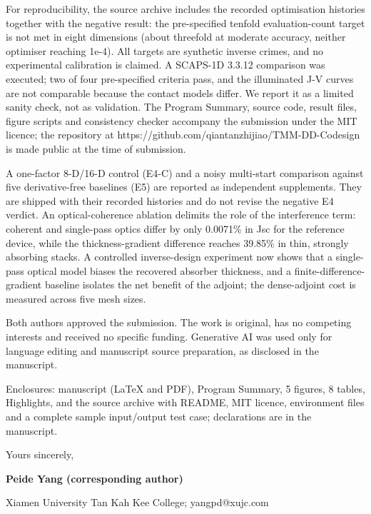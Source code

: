 \documentclass[10pt]{article}
\begin{document}
\vspace{2pt}
For reproducibility, the source archive includes the recorded optimisation histories together with the negative result: the pre-specified tenfold evaluation-count target is not met in eight dimensions (about threefold at moderate accuracy, neither optimiser reaching 1e-4). All targets are synthetic inverse crimes, and no experimental calibration is claimed. A SCAPS-1D 3.3.12 comparison was executed; two of four pre-specified criteria pass, and the illuminated J-V curves are not comparable because the contact models differ. We report it as a limited sanity check, not as validation. The Program Summary, source code, result files, figure scripts and consistency checker accompany the submission under the MIT licence; the repository at https://github.com/qiantanzhijiao/TMM-DD-Codesign is made public at the time of submission.\par
\vspace{2pt}
A one-factor 8-D/16-D control (E4-C) and a noisy multi-start comparison against five derivative-free baselines (E5) are reported as independent supplements. They are shipped with their recorded histories and do not revise the negative E4 verdict. An optical-coherence ablation delimits the role of the interference term: coherent and single-pass optics differ by only 0.0071\% in Jsc for the reference device, while the thickness-gradient difference reaches 39.85\% in thin, strongly absorbing stacks. A controlled inverse-design experiment now shows that a single-pass optical model biases the recovered absorber thickness, and a finite-difference-gradient baseline isolates the net benefit of the adjoint; the dense-adjoint cost is measured across five mesh sizes.\par
\vspace{2pt}
Both authors approved the submission. The work is original, has no competing interests and received no specific funding. Generative AI was used only for language editing and manuscript source preparation, as disclosed in the manuscript.\par
\vspace{2pt}
Enclosures: manuscript (LaTeX and PDF), Program Summary, 5 figures, 8 tables, Highlights, and the source archive with README, MIT licence, environment files and a complete sample input/output test case; declarations are in the manuscript.\par
\vspace{2pt}
Yours sincerely,\par
\vspace{2pt}
\textbf{Peide Yang (corresponding author)}\par
Xiamen University Tan Kah Kee College; yangpd@xujc.com\par
\end{document}
